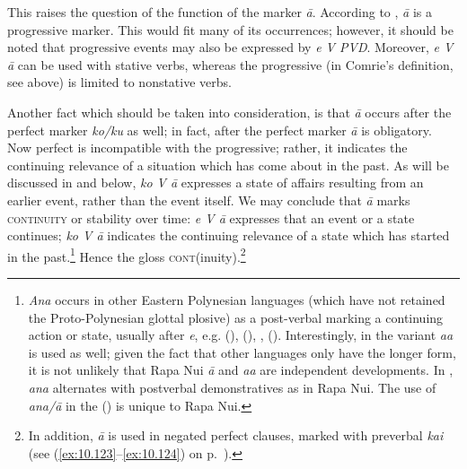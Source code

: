 This raises the question of the function of the marker \textit{{\ꞌ}ā}. According to \citet[52]{WeberR2003}, \textit{{\ꞌ}ā} is a progressive marker. This would fit many of its occurrences; however, it should be noted that progressive events may also be expressed by \textit{e V PVD}. Moreover, \textit{e V {\ꞌ}ā} can be used with stative verbs, whereas the progressive (in Comrie’s definition, see  above) is limited to nonstative verbs. 

Another fact which should be taken into consideration, is that \textit{{\ꞌ}ā} occurs after the perfect marker \textit{ko/ku} as well; in fact, after the perfect marker \textit{{\ꞌ}ā} is obligatory. Now perfect  is incompatible with the progressive; rather, it indicates the continuing relevance of a situation which has come about in the past. As will be discussed in  and  below, \textit{ko V {\ꞌ}ā} expresses a state of affairs resulting from an earlier event, rather than the event itself. We may conclude that \textit{{\ꞌ}ā} marks \textsc{continuity} or stability over time: \textit{e V {\ꞌ}ā} expresses that an event or a state continues; \textit{ko V {\ꞌ}ā} indicates the continuing relevance of a state which has started in the past.\footnote{\label{fn:328}\textit{Ana} occurs in other Eastern Polynesian languages (which have not retained the Proto-Polynesian glottal plosive) as a post-verbal  marking a continuing action or state, usually after  \textit{e}, e.g.  (\citealt[57–60]{ElbertPukui1979}),  (\citealt[67]{MutuTeìkitutoua2002}),  \citep[32]{Janeau1908},  (\citealt[416–419]{Bauer1993}). Interestingly, in  the variant \textit{aa} is used as well; given the fact that other languages only have the longer form, it is not unlikely that Rapa Nui \textit{{\ꞌ}ā} and  \textit{aa} are independent developments. In , \textit{ana} alternates with postverbal demonstratives as in Rapa Nui.
The use of \textit{{\ꞌ}ana/{\ꞌ}ā} in the  () is unique to Rapa Nui.} Hence the gloss \textsc{cont}(inuity).\footnote{\label{fn:329}In addition, \textit{{\ꞌ}ā} is used in negated perfect  clauses, marked with preverbal \textit{kai} (see (\ref{ex:10.123}–\ref{ex:10.124}) on p.~\pageref{ex:10.123}).} 

